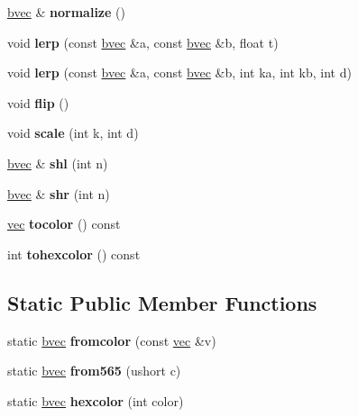 \begin{DoxyCompactItemize}
\hyperlink{structbvec}{bvec} \& {\bfseries normalize} ()
\item 
\mbox{\label{structbvec_afdc004ef1d1df53e5ac24211132b235c}} 
void {\bfseries lerp} (const \hyperlink{structbvec}{bvec} \&a, const \hyperlink{structbvec}{bvec} \&b, float t)
\item 
\mbox{\label{structbvec_a436a880c85d00936403e39617358008e}} 
void {\bfseries lerp} (const \hyperlink{structbvec}{bvec} \&a, const \hyperlink{structbvec}{bvec} \&b, int ka, int kb, int d)
\item 
\mbox{\label{structbvec_a92584009a5c5034ea7bd1ccf6fd3e938}} 
void {\bfseries flip} ()
\item 
\mbox{\label{structbvec_a132581e89e5ec166240e0c8d4b0f24d4}} 
void {\bfseries scale} (int k, int d)
\item 
\mbox{\label{structbvec_aa3120c65612684472cf80f2da7a04a90}} 
\hyperlink{structbvec}{bvec} \& {\bfseries shl} (int n)
\item 
\mbox{\label{structbvec_af6ae18991bb078b78ee0c2b2402033cb}} 
\hyperlink{structbvec}{bvec} \& {\bfseries shr} (int n)
\item 
\mbox{\label{structbvec_a4f4e4ca995c3920be10f01e1804f2672}} 
\hyperlink{structvec}{vec} {\bfseries tocolor} () const
\item 
\mbox{\label{structbvec_a0952f03823c2423bd9a00e9d8bbafa93}} 
int {\bfseries tohexcolor} () const
\end{DoxyCompactItemize}
\subsection*{Static Public Member Functions}
\begin{DoxyCompactItemize}
\item 
\mbox{\label{structbvec_a07ee436498b00c4dbdd93ea9ac9fa200}} 
static \hyperlink{structbvec}{bvec} {\bfseries fromcolor} (const \hyperlink{structvec}{vec} \&v)
\item 
\mbox{\label{structbvec_a4a4591ae59ac70a2d384f84a2f2381f0}} 
static \hyperlink{structbvec}{bvec} {\bfseries from565} (ushort c)
\item 
\mbox{\label{structbvec_a244eb6560992d7fcbd588018fb465e89}} 
static \hyperlink{structbvec}{bvec} {\bfseries hexcolor} (int color)
\end{DoxyCompactItemize}
